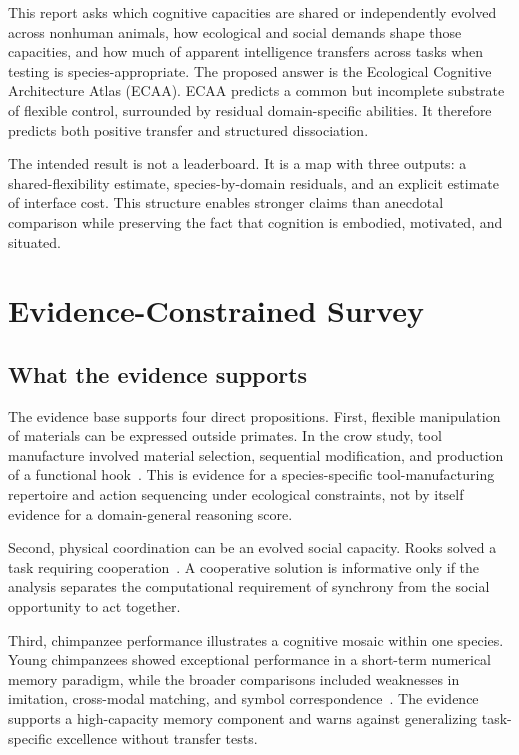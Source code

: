 \documentclass[conference]{IEEEtran}
\begin{document}
This report asks which cognitive capacities are shared or independently evolved across nonhuman animals, how ecological and social demands shape those capacities, and how much of apparent intelligence transfers across tasks when testing is species-appropriate. The proposed answer is the Ecological Cognitive Architecture Atlas (ECAA). ECAA predicts a common but incomplete substrate of flexible control, surrounded by residual domain-specific abilities. It therefore predicts both positive transfer and structured dissociation.

The intended result is not a leaderboard. It is a map with three outputs: a shared-flexibility estimate, species-by-domain residuals, and an explicit estimate of interface cost. This structure enables stronger claims than anecdotal comparison while preserving the fact that cognition is embodied, motivated, and situated.

\section{Evidence-Constrained Survey}
\subsection{What the evidence supports}
The evidence base supports four direct propositions. First, flexible manipulation of materials can be expressed outside primates. In the crow study, tool manufacture involved material selection, sequential modification, and production of a functional hook~\cite{hunt2004}. This is evidence for a species-specific tool-manufacturing repertoire and action sequencing under ecological constraints, not by itself evidence for a domain-general reasoning score.

Second, physical coordination can be an evolved social capacity. Rooks solved a task requiring cooperation~\cite{seed2008}. A cooperative solution is informative only if the analysis separates the computational requirement of synchrony from the social opportunity to act together.

Third, chimpanzee performance illustrates a cognitive mosaic within one species. Young chimpanzees showed exceptional performance in a short-term numerical memory paradigm, while the broader comparisons included weaknesses in imitation, cross-modal matching, and symbol correspondence~\cite{matsuzawa2009}. The evidence supports a high-capacity memory component and warns against generalizing task-specific excellence without transfer tests.
\end{document}
